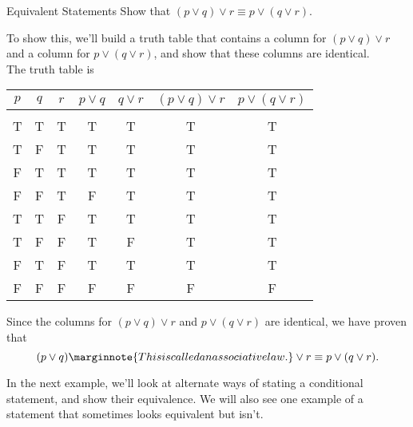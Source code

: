 \begin{example}[https://www.youtube.com/watch?v=RVZ8X7gFzio]{Equivalent Statements}
Show that $(p \vee q) \vee r \equiv p \vee (q \vee r)$.

\sol
To show this, we'll build a truth table that contains a column for $(p \vee q) \vee r$ and a column for $p \vee (q \vee r)$, and show that these columns are identical.\\

The truth table is 
\begin{center}
\begin{tabular}{|c c c c c c c|}
\hline
$p$ & $q$ & $r$ & $p \vee q$ & $q \vee r$ & $(p \vee q) \vee r$ & $p \vee (q \vee r)$\\
\hline
& & & & & & \\
T & T & T & T & T & T & T\\
T & F & T & T & T & T & T\\
F & T & T & T & T & T & T\\
F & F & T & F & T & T & T\\
T & T & F & T & T & T & T\\
T & F & F & T & F & T & T\\
F & T & F & T & T & T & T\\
F & F & F & F & F & F & F\\
\hline
\end{tabular}
\end{center}

Since the columns for $(p \vee q) \vee r$ and $p \vee (q \vee r)$ are identical, we have proven that \[(p \vee q)\marginnote{This is called an associative law.} \vee r \equiv p \vee (q \vee r).\]
\end{example}

In the next example, we'll look at alternate ways of stating a conditional statement, and show their equivalence.  We will also see one example of a statement that sometimes looks equivalent but isn't.
\vfill
\pagebreak


